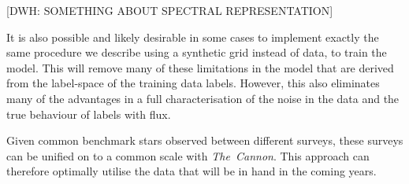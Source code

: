 \documentclass[12pt, preprint]{aastex}
\newcommand{\tc}{\textsl{The~Cannon}}
\newcommand{\apogee}{\textsl{APOGEE}}
\newcommand{\gaiaeso}{\textsl{Gaia-ESO}}
\begin{document}
[DWH: SOMETHING ABOUT SPECTRAL REPRESENTATION]
%
 
 It is also possible and likely desirable in some cases to implement exactly the same procedure we describe using a synthetic grid instead of data, to train the model. 
 This will remove many of these limitations in the model that are derived from the label-space of the training data labels. However, this also eliminates many of the advantages in a full characterisation of the noise in the data and the true behaviour of labels with flux.
 
Given common benchmark stars observed between different surveys, these surveys can be unified on to a common scale with \tc. This approach can therefore optimally utilise the data that will be in hand in the coming years. 
 
 
\end{document}
